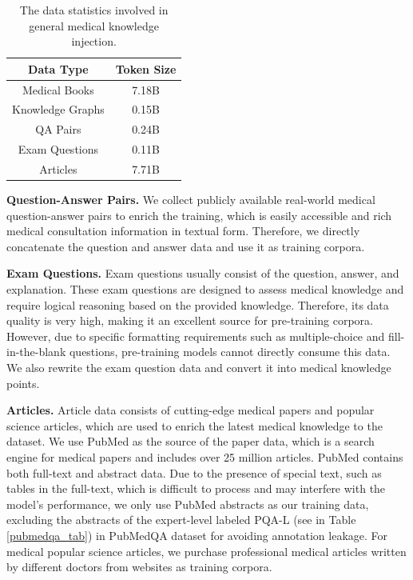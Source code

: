 \documentclass{article} %
\begin{document}
\begin{table}
\centering
\caption{The data statistics involved in general medical knowledge injection.}
\label{pretrain_data}
\begin{tabular}{cc}
\toprule
Data Type        & Token Size \\ \midrule
Medical Books            & 7.18B      \\
Knowledge Graphs & 0.15B      \\
QA Pairs         & 0.24B      \\
Exam Questions   & 0.11B      \\
Articles         & 7.71B      \\ \bottomrule
\end{tabular}
\end{table}

\textbf{Question-Answer Pairs.} We collect publicly available real-world medical question-answer pairs to enrich the training, which is easily accessible and rich medical consultation information in textual form. Therefore, we directly concatenate the question and answer data and use it as training corpora.

\textbf{Exam Questions.} Exam questions usually consist of the question, answer, and explanation. These exam questions are designed to assess medical knowledge and require logical reasoning based on the provided knowledge. Therefore, its data quality is very high, making it an excellent source for pre-training corpora. However, due to specific formatting requirements such as multiple-choice and fill-in-the-blank questions, pre-training models cannot directly consume this data. We also rewrite the exam question data and convert it into medical knowledge points.

\textbf{Articles.} Article data consists of cutting-edge medical papers and popular science articles, which are used to enrich the latest medical knowledge to the dataset. We use PubMed \cite{canese2013pubmed} as the source of the paper data, which is a search engine for medical papers and includes over 25 million articles. PubMed contains both full-text and abstract data. Due to the presence of special text, such as tables in the full-text, which is difficult to process and may interfere with the model's performance, we only use PubMed abstracts as our training data, excluding the abstracts of the expert-level labeled PQA-L (see in Table \ref{pubmedqa_tab}) in PubMedQA dataset for avoiding annotation leakage. For medical popular science articles, we purchase professional medical articles written by different doctors from websites as training corpora.
\end{document}
